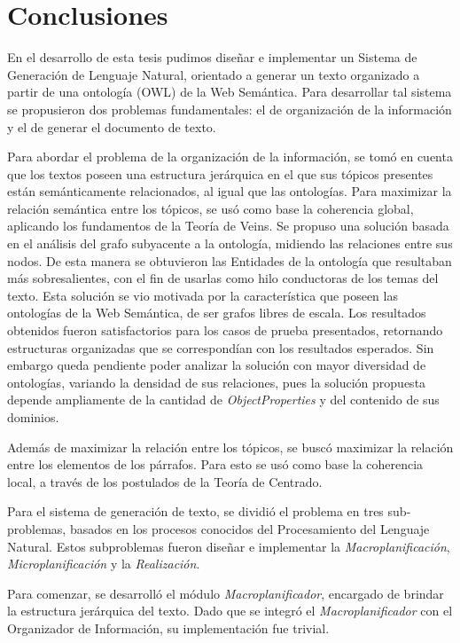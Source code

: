 \chapter{Conclusiones}
En el desarrollo de esta tesis pudimos diseñar e implementar un Sistema de Generación de Lenguaje Natural, orientado a generar un texto organizado a partir de una ontología (OWL) de la Web Semántica. Para desarrollar tal sistema se propusieron dos problemas fundamentales: el de organización de la información y el de generar el documento de texto. 

Para abordar el problema de la organización de la información, se tomó en cuenta que los textos poseen una estructura jerárquica en el que sus tópicos presentes están semánticamente relacionados, al igual que las ontologías. Para maximizar la relación semántica entre los tópicos, se usó como base la coherencia global, aplicando los fundamentos de la Teoría de Veins. Se propuso una solución basada en el análisis del grafo subyacente a la ontología, midiendo las relaciones entre sus nodos. De esta manera se obtuvieron las Entidades de la ontología que resultaban más sobresalientes, con el fin de usarlas como hilo conductoras de los temas del texto.
Esta solución se vio motivada por la característica que poseen las ontologías de la Web Semántica, de ser grafos libres de escala. Los resultados obtenidos fueron satisfactorios para los casos de prueba presentados, retornando estructuras organizadas que se correspondían con los resultados esperados. Sin embargo queda pendiente poder analizar la solución con mayor diversidad de ontologías, variando la densidad de sus relaciones, pues la solución propuesta depende ampliamente de la cantidad de \emph{ObjectProperties} y del contenido de sus dominios.

Además de maximizar la relación entre los tópicos, se buscó maximizar la relación entre los elementos de los párrafos. Para esto se usó como base la coherencia local, a través de los postulados de la Teoría de Centrado.

Para el sistema de generación de texto, se dividió el problema en tres sub-problemas, basados en los procesos conocidos del Procesamiento del Lenguaje Natural. Estos subproblemas fueron diseñar e implementar la \emph{Macroplanificación}, \emph{Microplanificación} y la \emph{Realización}. 

Para comenzar, se desarrolló el módulo \emph{Macroplanificador}, encargado de brindar la estructura jerárquica del texto. Dado que se integró el \emph{Macroplanificador} con el Organizador de Información, su implementación fue trivial.

